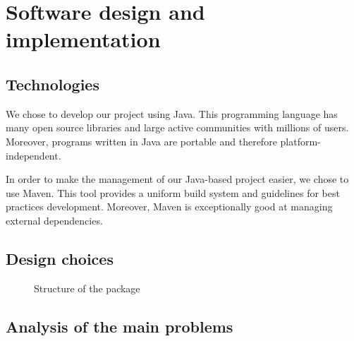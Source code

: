 \section{Software design and implementation}
    \subsection{Technologies}
        We chose to develop our project using Java. This programming language has many open source libraries and large active communities with millions of users. Moreover, programs written in Java are portable and therefore platform-independent.\par

        In order to make the management of our Java-based project easier, we chose to use Maven\footnotemark{}. This tool provides a uniform build system and guidelines for best practices development. Moreover, Maven is exceptionally good at managing external dependencies.\par

    \subsection{Design choices}
        \begin{figure}
			\centering
			
            \caption{Structure of the package }
			\label{stemby-package}
		\end{figure}
    \subsection{Analysis of the main problems}